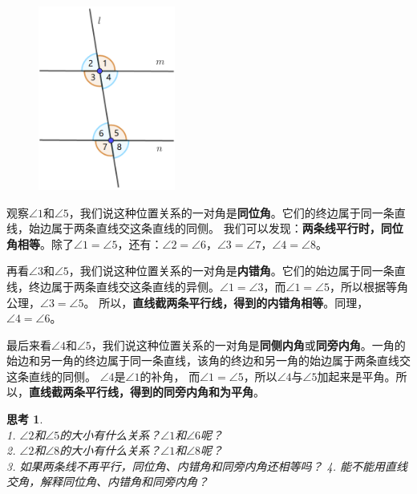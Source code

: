\documentclass[12pt,UTF8]{ctexbook}
\newtheorem{sk}{思考}[section]
\begin{document}
\begin{figure} %
    \includegraphics[width=0.4\textwidth]{三线八角.png}
\end{figure}

观察$\angle 1$和$\angle 5$，我们说这种位置关系的一对角是\textbf{同位角}。它们的终边属于同一条直线，始边属于两条直线交这条直线的同侧。
我们可以发现：\textbf{两条线平行时，同位角相等}。除了$\angle 1 = \angle 5$，还有：$\angle 2 = \angle 6$，$\angle 3 = \angle 7$，$\angle 4 = \angle 8$。

再看$\angle 3$和$\angle 5$，我们说这种位置关系的一对角是\textbf{内错角}。它们的始边属于同一条直线，终边属于两条直线交这条直线的异侧。$\angle 1 = \angle 3$，而$\angle 1 = \angle 5$，所以根据等角公理，$\angle 3 = \angle 5$。
所以，\textbf{直线截两条平行线，得到的内错角相等}。同理，$\angle 4 = \angle 6$。

最后来看$\angle 4$和$\angle 5$，我们说这种位置关系的一对角是\textbf{同侧内角}或\textbf{同旁内角}。一角的始边和另一角的终边属于同一条直线，该角的终边和另一角的始边属于两条直线交这条直线的同侧。
$\angle 4$是$\angle 1$的补角，
而$\angle 1 = \angle 5$，所以$\angle 4$与$\angle 5$加起来是平角。所以，\textbf{直线截两条平行线，得到的同旁内角和为平角}。

\begin{sk}\label{sk:1-1-0}
    \mbox{}\\
    1. $\angle 2$和$\angle 5$的大小有什么关系？$\angle 1$和$\angle 6$呢？\\
    2. $\angle 2$和$\angle 8$的大小有什么关系？$\angle 1$和$\angle 8$呢？\\
    3. 如果两条线不再平行，同位角、内错角和同旁内角还相等吗？
    4. 能不能用直线交角，解释同位角、内错角和同旁内角？
\end{sk}
\end{document}
